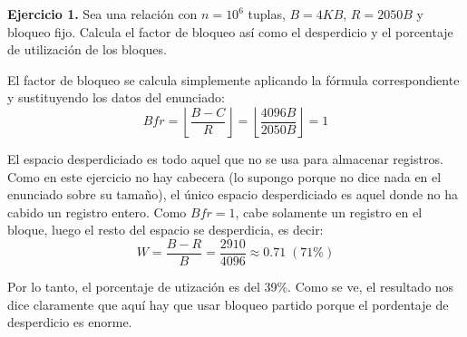 \documentclass[12pt]{report}
\newcommand{\floor}[1]{\left\lfloor #1 \right\rfloor}
\begin{document}
\textbf{Ejercicio 1.} Sea una relación con $n=10^6$ tuplas, $B=4KB$, $R=2050B$ y bloqueo fijo. Calcula el factor de bloqueo así como el desperdicio y el porcentaje de utilización de los bloques.

El factor de bloqueo se calcula simplemente aplicando la fórmula correspondiente y sustituyendo los datos del enunciado:
\[
Bfr=\floor{\frac{B-C}{R}}=\floor{\frac{4096B}{2050B}}=1
\]

El espacio desperdiciado es todo aquel que no se usa para almacenar registros. Como en este ejercicio no hay cabecera (lo supongo porque no dice nada en el enunciado sobre su tamaño), el único espacio desperdiciado es aquel donde no ha cabido un registro entero. Como $Bfr=1$, cabe solamente un registro en el bloque, luego el resto del espacio se desperdicia, es decir:
\[
W=\frac{B-R}{B}=\frac{2910}{4096}\approx 0.71 \; (71\%)
\]

Por lo tanto, el porcentaje de utización es del 39\%. Como se ve, el resultado nos dice claramente que aquí hay que usar bloqueo partido porque el pordentaje de desperdicio es enorme.
\end{document}
